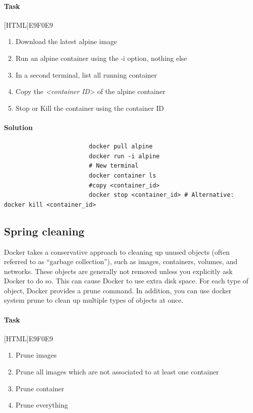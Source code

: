 \documentclass[12pt]{article}
\begin{document}
					\paragraph{Task}
						[HTML]{E9F0E9}{\parbox{\linewidth}{%
							\begin{enumerate}
								\item Download the latest alpine image
								\item Run an alpine container using the -i option, nothing else
								\item In a second terminal, list all running container
								\item Copy the \textit{<container ID}> of the alpine container
								\item Stop or Kill the container using the container ID
							\end{enumerate}
					}}
					
			\paragraph{Solution}	

				\begin{minipage}{\linewidth}
					\begin{lstlisting}
						docker pull alpine
						docker run -i alpine
						# New terminal
						docker container ls
						#copy <container_id>
						docker stop <container_id> # Alternative: docker kill <container_id>
					\end{lstlisting}
				\end{minipage}

				\subsection{Spring cleaning}
					Docker takes a conservative approach to cleaning up unused objects (often referred to as “garbage collection”), such as images, containers, volumes, and networks.
					These objects are generally not removed unless you explicitly ask Docker to do so. 
					This can cause Docker to use extra disk space. 
					For each type of object, Docker provides a prune command. 
					In addition, you can use docker system prune to clean up multiple types of objects at once. 
					
					\paragraph{Task}
						[HTML]{E9F0E9}{\parbox{\linewidth}{%
							\begin{enumerate}
								\item Prune images
								\item Prune all images which are not associated to at least one container
								\item Prune container
								\item Prune everything
							\end{enumerate}
						}}
				
\end{document}
